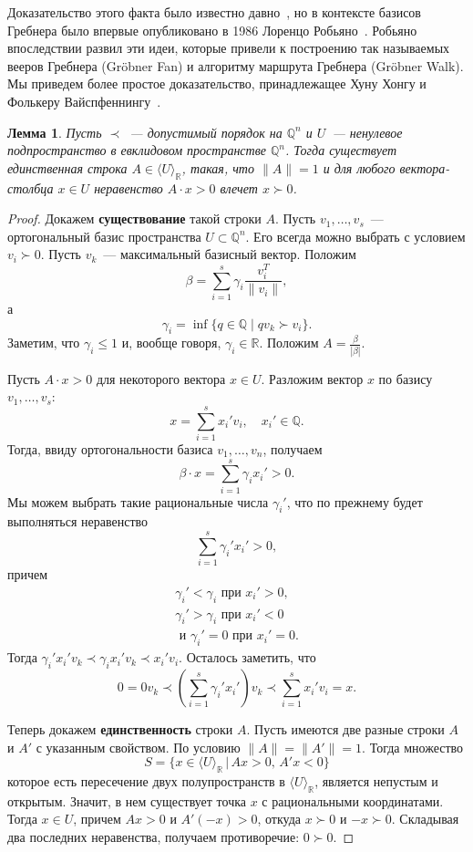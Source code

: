 \documentclass[a4paper,reqno,12pt]{amsart}
\theoremstyle{plain}
\newtheorem{lemma}[theorem]{Лемма}
\theoremstyle{remark}
\theoremstyle{definition}
\renewcommand{\le}{\leqslant}
\newcommand{\Q}{\mathbb{Q}}
\newcommand{\R}{\mathbb{R}}
\newcommand{\admOrd}{\prec}
\newcommand{\admOrdG}{\succ}
\begin{document}
Доказательство этого факта было известно давно~\cite{Tre}, 
но в контексте базисов Гребнера было впервые опубликовано в 1986 Лоренцо Робьяно~\cite{Robb1, Robb2}.
Робьяно впоследствии развил эти идеи, которые привели к построению так называемых вееров Гребнера (Gr\"obner Fan) и алгоритму маршрута Гребнера (Gr\"obner Walk).
Мы приведем более простое доказательство, принадлежащее Хуну Хонгу и Фолькеру Вайспфеннингу~\cite{HongWeispf}.

\begin{lemma}
 Пусть $\admOrd$~--- допустимый порядок на $\Q^n$ и $U$~--- ненулевое подпространство в евклидовом пространстве $\Q^n$.
Тогда существует единственная строка $A \in \langle U \rangle_{\R}$, такая, что $\| A \| = 1$ и для любого вектора-столбца $x \in U$
неравенство $A \cdot x > 0$ влечет $x \admOrdG 0$.
\end{lemma}

\begin{proof}
Докажем {\bf существование} такой строки $A$.
Пусть $v_1, \ldots, v_s$~--- ортогональный базис пространства $U \subset \Q^n$.
Его всегда можно выбрать с условием $v_i \admOrdG 0$.
Пусть $v_k$~--- максимальный базисный вектор.
Положим
$$
 \beta = \sum_{i=1}^s \gamma_i \frac{v_i^T}{\| v_i \|},
$$
а
$$ 
 \gamma_i = \inf \{ q \in \Q \mid q v_k \admOrdG v_i\}.
$$ 
Заметим, что $\gamma_i \le 1$ и, вообще говоря, $\gamma_i \in \R$.
Положим $A = \frac{\beta}{|\beta|}$.

Пусть $A \cdot x > 0$ для некоторого вектора $x \in U$.
Разложим вектор $x$ по базису $v_1, \ldots, v_s$:
$$
 x = \sum_{i=1}^s x_i' v_i, \quad x_i' \in \Q.
$$
Тогда, ввиду ортогональности базиса $v_1, \ldots, v_n$, получаем
$$
 \beta \cdot x = \sum_{i=1}^s \gamma_i x_i' > 0.
$$
Мы можем выбрать такие рациональные числа $\gamma_i'$,
что по прежнему будет выполняться неравенство 
$$
 \sum_{i=1}^s \gamma_i' x_i' > 0,
$$
причем
\begin{gather*}
 \gamma_i' < \gamma_i \text{ при } x_i' > 0,\\
 \gamma_i' > \gamma_i \text{ при } x_i' < 0 \\
 \text{ и } \gamma_i' = 0 \text{ при } x_i' = 0.
\end{gather*}
Тогда $\gamma_i' x_i' v_k \admOrd \gamma_i x_i' v_k \admOrd x_i' v_i$.
Осталось заметить, что
$$
 0 = 0 v_k \admOrd \left(\sum_{i=1}^s \gamma_i' x_i' \right) v_k \admOrd \sum_{i=1}^s x_i' v_i = x.
$$ 

Теперь докажем {\bf единственность} строки $A$.
Пусть имеются две разные строки $A$ и $A'$ с указанным свойством.
По условию $\| A \| = \| A' \| = 1$.
Тогда множество 
$$
 S = \{ x \in \langle U \rangle_{\R} \,|\, Ax > 0, \, A'x < 0\}
$$
которое есть пересечение двух полупространств в $\langle U \rangle_{\R}$,
является непустым и открытым.
Значит, в нем существует точка $x$ с рациональными координатами.
Тогда $x \in U$, причем $Ax > 0$ и $A'(-x) > 0$,
откуда $x \admOrdG 0$ и $-x \admOrdG 0$.
Складывая два последних неравенства, получаем противоречие: $0 \admOrdG 0$.
\end{proof}
\end{document}
